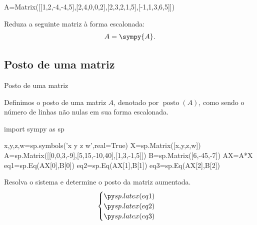\begin{frame}[label=sistemas,fragile=singleslide]{ }
\begin{sympycode}
A=Matrix([[1,2,-4,-4,5],[2,4,0,0,2],[2,3,2,1,5],[-1,1,3,6,5]])
\end{sympycode}
\begin{exer}
Reduza a seguinte matriz à forma escalonada:
\[
A=\sympy{A}.
\]
\end{exer}

\end{frame}


\subsection*{Posto de uma matriz}
%
%
%

\begin{frame}[label=sistemas,fragile=singleslide]{Posto de uma matriz}

\begin{defin}
Definimos o {\color{blue} posto} de uma matriz $A$, denotado por $\operatorname{posto}(A)$, como sendo o número de linhas não nulas em sua forma escalonada.
\end{defin}

\begin{pycode}
import sympy as sp

x,y,z,w=sp.symbols('x y z w',real=True)
X=sp.Matrix([x,y,z,w])
A=sp.Matrix([[0,0,3,-9],[5,15,-10,40],[1,3,-1,5]])
B=sp.Matrix([6,-45,-7])
AX=A*X
eq1=sp.Eq(AX[0],B[0])
eq2=sp.Eq(AX[1],B[1])
eq3=sp.Eq(AX[2],B[2])
\end{pycode}

\begin{exe}
Resolva o sistema e determine o posto da matriz aumentada.
\[\begin{cases}
\pyl{eq1}\\
\pyl{eq2}\\
\pyl{eq3}
\end{cases}\]
\end{exe}
\end{frame}


